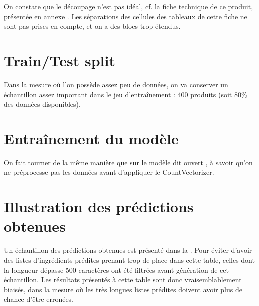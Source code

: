         \begin{multicols}{3}
        \begin{spacing}{1.0}
        \label{blocks_examples}
        {\tiny
        
        }
        \end{spacing}
        \end{multicols}

        On constate que le découpage n'est pas idéal, cf. la fiche technique de ce produit, présentée en annexe .
        Les séparations des cellules des tableaux de cette fiche ne sont pas prises en compte, et on a des blocs trop étendus.

        \section{Train/Test split}

        Dans la mesure où l'on possède assez peu de données, on va conserver un échantillon assez important dans le jeu d'entraînement : 400 produits (soit 80\% des données disponibles).

        \section{Entraînement du modèle}

        On fait tourner de la même manière que sur le modèle dit \og ouvert \fg, à savoir qu'on ne préprocesse pas les données avant d'appliquer le CountVectorizer.

        \section{Illustration des prédictions obtenues}

        Un échantillon des prédictions obtenues est présenté dans la .
        Pour éviter d'avoir des listes d'ingrédients prédites prenant trop de place dans cette table, celles dont la longueur dépasse 500 caractères ont été filtrées avant génération de cet échantillon.
        Les résultats présentés à cette table sont donc vraisemblablement biaisés, dans la mesure où les très longues listes prédites doivent avoir plus de chance d'être erronées.

